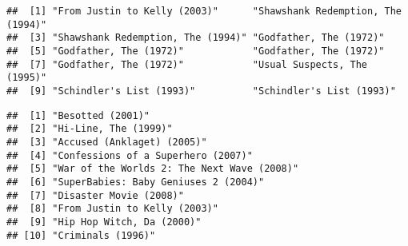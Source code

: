 \documentclass[
]{article}
\newenvironment{Shaded}{\begin{snugshade}}{\end{snugshade}}
\newcommand{\DataTypeTok}[1]{\textcolor[rgb]{0.13,0.29,0.53}{#1}}
\newcommand{\DecValTok}[1]{\textcolor[rgb]{0.00,0.00,0.81}{#1}}
\newcommand{\KeywordTok}[1]{\textcolor[rgb]{0.13,0.29,0.53}{\textbf{#1}}}
\newcommand{\NormalTok}[1]{#1}
\newcommand{\OperatorTok}[1]{\textcolor[rgb]{0.81,0.36,0.00}{\textbf{#1}}}
\newcommand{\StringTok}[1]{\textcolor[rgb]{0.31,0.60,0.02}{#1}}
\begin{document}
\begin{verbatim}
##  [1] "From Justin to Kelly (2003)"      "Shawshank Redemption, The (1994)"
##  [3] "Shawshank Redemption, The (1994)" "Godfather, The (1972)"           
##  [5] "Godfather, The (1972)"            "Godfather, The (1972)"           
##  [7] "Godfather, The (1972)"            "Usual Suspects, The (1995)"      
##  [9] "Schindler's List (1993)"          "Schindler's List (1993)"
\end{verbatim}

\begin{Shaded}
\end{Shaded}

\begin{verbatim}
##  [1] "Besotted (2001)"                          
##  [2] "Hi-Line, The (1999)"                      
##  [3] "Accused (Anklaget) (2005)"                
##  [4] "Confessions of a Superhero (2007)"        
##  [5] "War of the Worlds 2: The Next Wave (2008)"
##  [6] "SuperBabies: Baby Geniuses 2 (2004)"      
##  [7] "Disaster Movie (2008)"                    
##  [8] "From Justin to Kelly (2003)"              
##  [9] "Hip Hop Witch, Da (2000)"                 
## [10] "Criminals (1996)"
\end{verbatim}

\begin{Shaded}
\end{Shaded}
\end{document}
